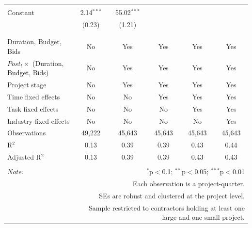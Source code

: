 \documentclass[
]{article}
\begin{document}
\begin{table}[H]
\begin{tabular}{@{\extracolsep{-2pt}}lccccc}
  & & & & & \\ 
 Constant & 2.14$^{***}$ & 55.02$^{***}$ &  &  &  \\ 
  & (0.23) & (1.21) &  &  &  \\ 
  & & & & & \\ 
\hline \\[-1.8ex] 
Duration, Budget, Bids & No & Yes & Yes & Yes & Yes \\ 
$Post_t \times $  (Duration, Budget, Bids) & No & Yes & Yes & Yes & Yes \\ 
Project stage & No & Yes & Yes & Yes & Yes \\ 
Time fixed effects & No & No & Yes & Yes & Yes \\ 
Task fixed effects & No & No & No & Yes & Yes \\ 
Industry fixed effects & No & No & No & No & Yes \\ 
Observations & 49,222 & 45,643 & 45,643 & 45,643 & 45,643 \\ 
R$^{2}$ & 0.13 & 0.39 & 0.39 & 0.43 & 0.44 \\ 
Adjusted R$^{2}$ & 0.13 & 0.39 & 0.39 & 0.43 & 0.43 \\ 
\hline 
\hline \\[-1.8ex] 
\textit{Note:}  & \multicolumn{5}{r}{$^{*}$p$<$0.1; $^{**}$p$<$0.05; $^{***}$p$<$0.01} \\ 
 & \multicolumn{5}{r}{Each observation is a project-quarter.} \\ 
 & \multicolumn{5}{r}{SEs are robust and clustered at the project level.} \\ 
 & \multicolumn{5}{r}{Sample restricted to contractors holding at least one large and one small project.} \\ 
\end{tabular} 
\end{table}
\end{document}

